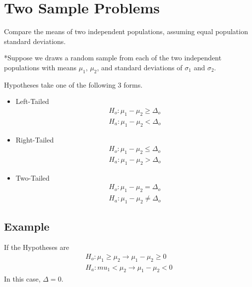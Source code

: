 \documentclass{article}
\begin{document}
        \section*{Two Sample Problems}
        Compare the means of two independent populations, assuming equal population standard deviations.\par

        *Suppose we draws a random sample from each of the two independent populations 
        with means $\mu_{1}$, $\mu_{2}$, and standard deviations of $\sigma_{1}$ and $\sigma_{2}$.\par

        Hypotheses take one of the following 3 forms.
        \begin{itemize}
            \item Left-Tailed
                \begin{align*}
                    H_{o}: \mu_{1} -  \mu_{2} \geq \Delta_o\\
                    H_{a}: \mu_{1} -  \mu_{2} < \Delta_o
                \end{align*}
            \item Right-Tailed
                \begin{align*}
                    H_{o}: \mu_{1} -  \mu_{2} \leq \Delta_o\\
                    H_{a}: \mu_{1} -  \mu_{2} > \Delta_o
                \end{align*}
            \item Two-Tailed
                \begin{align*}
                    H_{o}: \mu_{1} -  \mu_{2} = \Delta_o\\
                    H_{a}: \mu_{1} -  \mu_{2} \neq \Delta_o
                \end{align*}
        \end{itemize}

        \subsection*{Example}

        If the Hypotheses are
            \begin{align*}
                H_{o}: \mu_{1} \geq  \mu_{2} \rightarrow \mu_{1} - \mu_{2} \geq 0\\
                H_{a}: mu_{1} <  \mu_{2}  \rightarrow \mu_{1} - \mu_{2} < 0
            \end{align*}
        In this case, $\Delta = 0$.
\end{document}
